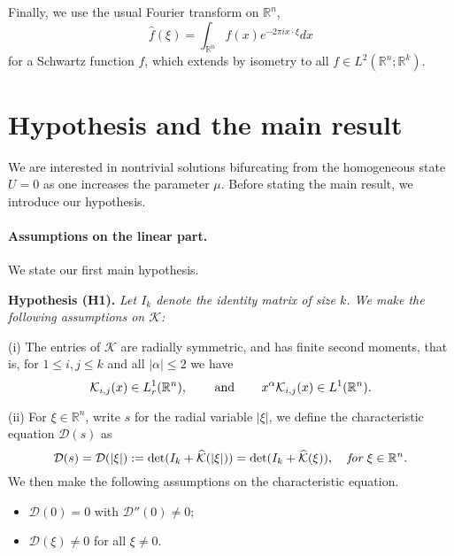 \documentclass[letterpaper,11pt]{article}
\newcommand{\R}{\mathbb{R}}
\newcommand{\K}{\mathcal{K}}
\numberwithin{equation}{section}
\newenvironment{Hypothesis}[1]%
  {\begin{trivlist}\item[]{\bf Hypothesis #1 }\em}{\end{trivlist}}
\theoremstyle{plain}
\theoremstyle{remark}
\begin{document}
Finally, we use the usual Fourier transform on $\R^n$, 
\[
\widehat{f} (\xi)= \int_{\R^n} f(x)e^{-2\pi i x\cdot \xi}dx
\]
 for a Schwartz function $f$, which extends by isometry to all $f \in L^2(\R^n;\R^k)$. 




\section{Hypothesis and the main result}

We are interested in nontrivial solutions bifurcating from the homogeneous state $U = 0$ as one increases the parameter $\mu$. Before stating the main result, we introduce our hypothesis.

\paragraph{Assumptions on the linear part.}We state our first main hypothesis.
\begin{Hypothesis}{(H1).}Let $I_k$ denote the identity matrix of size $k$. We make the following assumptions on $\K$:
\item (i)  The entries of $\K$ are radially symmetric, and has finite second moments, that is, for $1\le i,j\le k$ and all $|\alpha|\le 2$ we have
\[
 \K_{i,j}(x) \in L^1_r(\R^n), \hspace{0.3in}\text{and}\hspace{0.3in}  x^\alpha \K_{i,j}(x) \in L^1(\R^n).
\]


\item [(ii)] For $\xi \in \R^n$, write $s$ for the radial variable $|\xi|$, we define the characteristic equation $\mathcal{D}(s)$ as
\[\mathcal{D}(s) = 
\mathcal{D}(|\xi|):=\det(I_k+\widehat{\K}(|\xi|))= \det(I_k+\widehat{\K}(\xi)),\hspace{0.1in} \textit{ for } \xi \in \R^n.\] We then make the following assumptions on the characteristic equation.
\begin{itemize}
\item $\mathcal{D}(0)= 0$ with $\mathcal{D}''(0) \neq 0$;
\item $\mathcal{D}(\xi) \neq 0$ for all $\xi \neq 0$.
\end{itemize}
\end{Hypothesis}
\end{document}
